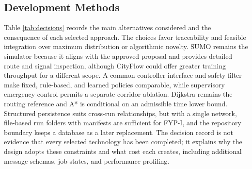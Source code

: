 \subsection{Development Methods}

Table \ref{tab:decisions} records the main alternatives considered and the consequence of each selected approach. The choices favor traceability and feasible integration over maximum distribution or algorithmic novelty. SUMO remains the simulator because it aligns with the approved proposal and provides detailed route and signal inspection, although CityFlow could offer greater training throughput for a different scope. A common controller interface and safety filter make fixed, rule-based, and learned policies comparable, while supervisory emergency control permits a separate corridor ablation. Dijkstra remains the routing reference and A* is conditional on an admissible time lower bound. Structured persistence suits cross-run relationships, but with a single network, file-based run folders with manifests are sufficient for FYP-I, and the repository boundary keeps a database as a later replacement. The decision record is not evidence that every selected technology has been completed; it explains why the design adopts these constraints and what cost each creates, including additional message schemas, job states, and performance profiling.

